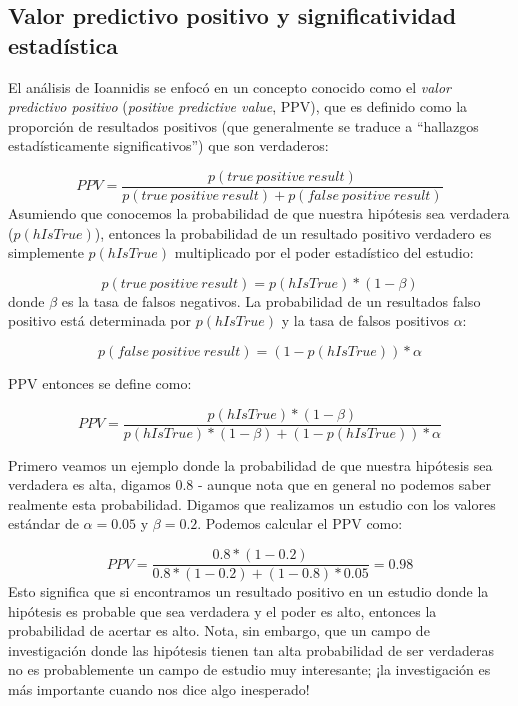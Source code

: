 \documentclass[
  12pt,
]{book}
\begin{document}
\hypertarget{valor-predictivo-positivo-y-significatividad-estaduxedstica}{%
\subsection{Valor predictivo positivo y significatividad estadística}\label{valor-predictivo-positivo-y-significatividad-estaduxedstica}}

El análisis de Ioannidis se enfocó en un concepto conocido como el \emph{valor predictivo positivo} (\emph{positive predictive value}, PPV), que es definido como la proporción de resultados positivos (que generalmente se traduce a ``hallazgos estadísticamente significativos'') que son verdaderos:

\[
PPV = \frac{p(true\ positive\ result)}{p(true\ positive\ result) + p(false\ positive\ result)}
\]
Asumiendo que conocemos la probabilidad de que nuestra hipótesis sea verdadera (\(p(hIsTrue)\)), entonces la probabilidad de un resultado positivo verdadero es simplemente \(p(hIsTrue)\) multiplicado por el poder estadístico del estudio:

\[
p(true\ positive\ result) = p(hIsTrue) * (1 - \beta)
\]
donde \(\beta\) es la tasa de falsos negativos. La probabilidad de un resultados falso positivo está determinada por \(p(hIsTrue)\) y la tasa de falsos positivos \(\alpha\):

\[
p(false\ positive\ result) = (1 - p(hIsTrue)) * \alpha
\]

PPV entonces se define como:

\[
PPV = \frac{p(hIsTrue) * (1 - \beta)}{p(hIsTrue) * (1 - \beta) + (1 - p(hIsTrue)) * \alpha}
\]

Primero veamos un ejemplo donde la probabilidad de que nuestra hipótesis sea verdadera es alta, digamos 0.8 - aunque nota que en general no podemos saber realmente esta probabilidad. Digamos que realizamos un estudio con los valores estándar de \(\alpha=0.05\) y \(\beta=0.2\). Podemos calcular el PPV como:

\[
PPV = \frac{0.8 * (1 - 0.2)}{0.8 * (1 - 0.2) + (1 - 0.8) * 0.05} = 0.98
\]
Esto significa que si encontramos un resultado positivo en un estudio donde la hipótesis es probable que sea verdadera y el poder es alto, entonces la probabilidad de acertar es alto. Nota, sin embargo, que un campo de investigación donde las hipótesis tienen tan alta probabilidad de ser verdaderas no es probablemente un campo de estudio muy interesante; ¡la investigación es más importante cuando nos dice algo inesperado!
\end{document}
